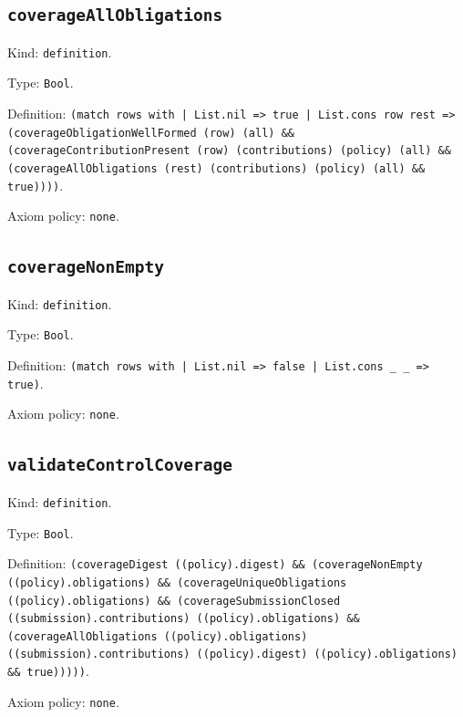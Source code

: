 \documentclass[11pt]{article}
\begin{document}
\subsection*{\texttt{coverageAllObligations}}
\noindent Kind: \texttt{definition}.\par
\noindent Type: \texttt{Bool}.\par
\noindent Definition: \texttt{(match rows with | List.nil => true | List.cons row rest => (coverageObligationWellFormed (row) (all) \&\& (coverageContributionPresent (row) (contributions) (policy) (all) \&\& (coverageAllObligations (rest) (contributions) (policy) (all) \&\& true))))}.\par
\noindent Axiom policy: \texttt{none}.\par
\subsection*{\texttt{coverageNonEmpty}}
\noindent Kind: \texttt{definition}.\par
\noindent Type: \texttt{Bool}.\par
\noindent Definition: \texttt{(match rows with | List.nil => false | List.cons \_ \_ => true)}.\par
\noindent Axiom policy: \texttt{none}.\par
\subsection*{\texttt{validateControlCoverage}}
\noindent Kind: \texttt{definition}.\par
\noindent Type: \texttt{Bool}.\par
\noindent Definition: \texttt{(coverageDigest ((policy).digest) \&\& (coverageNonEmpty ((policy).obligations) \&\& (coverageUniqueObligations ((policy).obligations) \&\& (coverageSubmissionClosed ((submission).contributions) ((policy).obligations) \&\& (coverageAllObligations ((policy).obligations) ((submission).contributions) ((policy).digest) ((policy).obligations) \&\& true)))))}.\par
\noindent Axiom policy: \texttt{none}.\par
\end{document}
